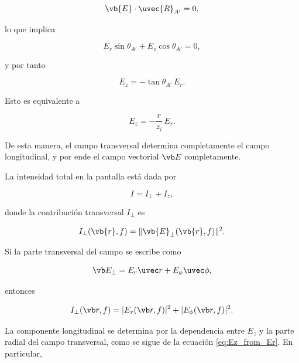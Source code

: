 \begin{equation}
\vb{E}\cdot\uvec{R}_{A'}=0,
\label{eq:transversality_condition}
\end{equation}

lo que implica

\begin{equation}
E_r\sin\theta_{A'} + E_z\cos\theta_{A'} = 0,
\end{equation}

y por tanto

\begin{equation}
E_z
=
-\tan\theta_{A'}\,E_r.
\label{eq:Ez_from_Er}
\end{equation}

Esto es equivalente a

\begin{equation}
  E_z
  =
  -\frac{r}{z_i} \,E_r.
\label{eq:Ez_from_Er_rz}
\end{equation}

De esta manera, el campo transversal determina completamente el campo longitudinal, y por ende el campo vectorial $\vb E$ completamente.

La intensidad total en la pantalla está dada por

\begin{equation}
  I
  =
  I_\perp
  +
  I_z,
  \label{eq:Intensity_in_Focal_Plane_decomp}
\end{equation}

donde la contribución transversal $I_\perp$ es

\begin{equation}
    I_\perp(\vb{r}, f)
    =
    \|\vb{E}_\perp(\vb{r}, f)\|^2.
\end{equation}

Si la parte transversal del campo se escribe como

\begin{equation}
  \vb E_\perp
  =
  E_r \uvec r
  +
  E_\phi \uvec \phi ,
\end{equation}

entonces

\begin{equation}
  I_\perp(\vb r, f)
  =
  |E_r(\vb r, f)|^2
  +
  |E_\phi(\vb r, f)|^2 .
\end{equation}

La componente longitudinal se determina por la dependencia entre $E_z$ y la parte radial del campo transversal, como se sigue de la ecuación \eqref{eq:Ez_from_Er}. En particular,

